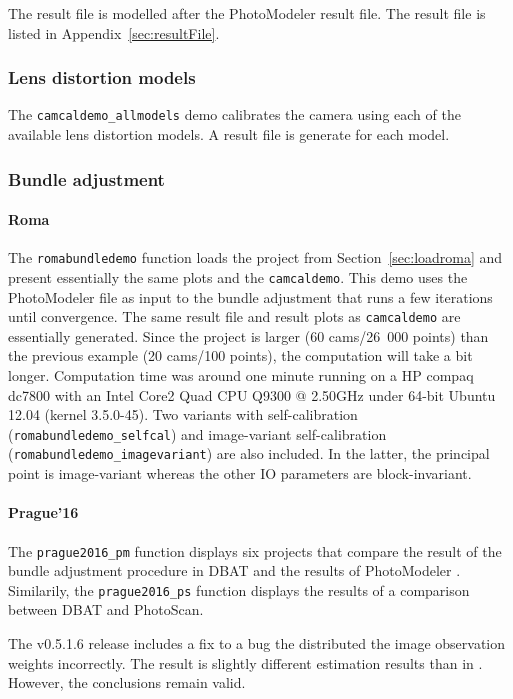 \documentclass{article}
\begin{document}
The result file is modelled after the PhotoModeler result file.
The result file is listed in Appendix~\ref{sec:resultFile}.

\subsubsection{Lens distortion models}

The \texttt{camcaldemo\_allmodels} demo calibrates the camera using
each of the available lens distortion models. A result file is
generate for each model.

\newpage

\subsubsection{Bundle adjustment}

\paragraph{\sc Roma}
The \texttt{romabundledemo} function loads the project from
Section~\ref{sec:loadroma} and present essentially the same plots and
the \texttt{camcaldemo}. This demo uses the PhotoModeler file as input
to the bundle adjustment that runs a few iterations until convergence.
The same result file and result plots as \texttt{camcaldemo} are
essentially generated. Since the project is larger (60 cams/26~000
points) than the previous example (20 cams/100 points), the
computation will take a bit longer. Computation time was around one
minute running on a HP compaq dc7800 with an Intel Core2 Quad CPU
Q9300 @ 2.50GHz under 64-bit Ubuntu 12.04 (kernel 3.5.0-45). Two
variants with self-calibration (\texttt{romabundledemo\_selfcal}) and
image-variant self-calibration (\texttt{romabundledemo\_imagevariant})
are also included. In the latter, the principal point is image-variant
whereas the other IO parameters are block-invariant.

\paragraph{\sc Prague'16}
The \texttt{prague2016\_pm} function displays six projects that
compare the result of the bundle adjustment procedure in DBAT and the
results of PhotoModeler \citep{Borlin2016:External}. Similarily, the
\texttt{prague2016\_ps} function displays the results of a comparison
between DBAT and PhotoScan.

The v0.5.1.6 release includes a fix to a bug the distributed the image
observation weights incorrectly. The result is slightly different
estimation results than in \citet{Borlin2016:External}. However, the
conclusions remain valid.
\end{document}
